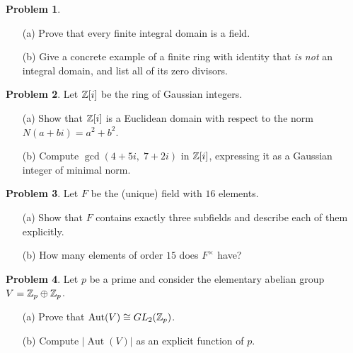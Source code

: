 \documentclass[12pt]{article}
\theoremstyle{definition} %
\newtheorem{problem}{Problem}
\theoremstyle{plain} %
\begin{document}
\bigskip
\begin{problem}
  \begin{enumerate}
      \item[(a)] Prove that every finite integral domain is a field.
      \item[(b)] Give a concrete example of a finite ring with identity
                that \emph{is not} an integral domain, and list all of its
                zero divisors.
  \end{enumerate}
\end{problem}

\bigskip
\begin{problem}
  Let \(\mathbb Z[i]\) be the ring of Gaussian integers.
  \begin{enumerate}
      \item[(a)] Show that \(\mathbb Z[i]\) is a Euclidean domain with respect
                to the norm \(N(a+bi)=a^{2}+b^{2}\).
      \item[(b)] Compute \(\gcd(4+5i,\;7+2i)\) in \(\mathbb Z[i]\), expressing it
                as a Gaussian integer of minimal norm.
  \end{enumerate}
\end{problem}

\bigskip
\begin{problem}
  Let \(F\) be the (unique) field with \(16\) elements.
  \begin{enumerate}
      \item[(a)] Show that \(F\) contains exactly three subfields and
                describe each of them explicitly.
      \item[(b)] How many elements of order \(15\) does \(F^{\times}\) have?
  \end{enumerate}
\end{problem}

\bigskip
\begin{problem}
  Let \(p\) be a prime and consider the elementary abelian group
  \(V=\mathbb Z_{p}\oplus\mathbb Z_{p}\).
  \begin{enumerate}
      \item[(a)] Prove that \(\operatorname{Aut}(V)\cong GL_{2}(\mathbb Z_{p})\).
      \item[(b)] Compute \(|\operatorname{Aut}(V)|\) as an explicit
                function of \(p\).
  \end{enumerate}
\end{problem}
\end{document}
